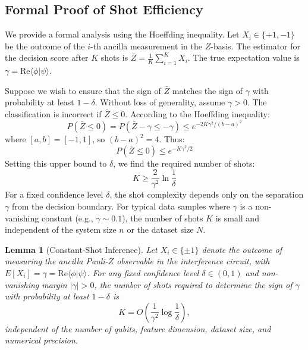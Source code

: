 \documentclass[conference]{IEEEtran}
\begin{document}
\subsection{Formal Proof of Shot Efficiency}

We provide a formal analysis using the Hoeffding inequality. Let $X_i \in \{+1, -1\}$ be the outcome of the $i$-th ancilla measurement in the $Z$-basis. The estimator for the decision score after $K$ shots is $\bar{Z} = \frac{1}{K} \sum_{i=1}^K X_i$. The true expectation value is $\gamma = \mathrm{Re}\langle \phi | \psi \rangle$.

Suppose we wish to ensure that the sign of $\bar{Z}$ matches the sign of $\gamma$ with probability at least $1-\delta$. Without loss of generality, assume $\gamma > 0$. The classification is incorrect if $\bar{Z} \leq 0$. According to the Hoeffding inequality:
\begin{equation}
    P(\bar{Z} \leq 0) = P(\bar{Z} - \gamma \leq -\gamma) \leq e^{-2K\gamma^2 / (b-a)^2}
\end{equation}
where $[a, b] = [-1, 1]$, so $(b-a)^2 = 4$. Thus:
\begin{equation}
    P(\bar{Z} \leq 0) \leq e^{-K\gamma^2 / 2}
\end{equation}
Setting this upper bound to $\delta$, we find the required number of shots:
\begin{equation}
    K \geq \frac{2}{\gamma^2} \ln \frac{1}{\delta}
\end{equation}
For a fixed confidence level $\delta$, the shot complexity depends only on the separation $\gamma$ from the decision boundary. For typical data samples where $\gamma$ is a non-vanishing constant (e.g., $\gamma \sim 0.1$), the number of shots $K$ is small and independent of the system size $n$ or the dataset size $N$.

\newtheorem{lemma}{Lemma}
\begin{lemma}[Constant-Shot Inference]
Let $X_i \in \{\pm 1\}$ denote the outcome of measuring the ancilla Pauli-$Z$ observable in the interference circuit, with $E[X_i] = \gamma = \mathrm{Re}\langle \phi | \psi \rangle$. For any fixed confidence level $\delta \in (0, 1)$ and non-vanishing margin $|\gamma| > 0$, the number of shots required to determine the sign of $\gamma$ with probability at least $1-\delta$ is 
\begin{equation}
K = O\left( \frac{1}{\gamma^2} \log \frac{1}{\delta} \right),
\end{equation}
independent of the number of qubits, feature dimension, dataset size, and numerical precision.
\end{lemma}
\end{document}
